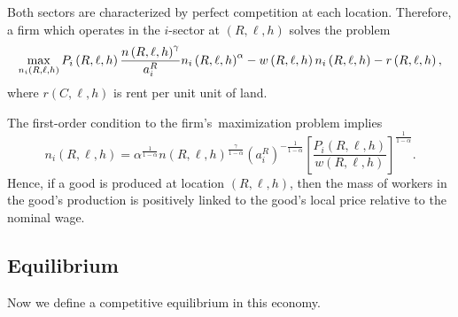\documentclass[12pt]{article}
\begin{document}
Both sectors are characterized by perfect competition
at each location. Therefore, a firm which operates in the $i$-sector at $%
\left( R,\ell ,h\right) $ solves the problem%
\begin{equation*}
\max_{n_{i}\left( R,\ell ,h\right) }P_{i}\left( R,\ell ,h\right) \frac{%
n \left( R,\ell ,h\right) ^{\gamma }}{a_{i}^{R}} n_{i}\left( R,\ell ,h\right) ^{\alpha } 
- w\left( R,\ell ,h\right)
n_{i}\left( R,\ell ,h\right) -r\left( R,\ell ,h\right) ,
\end{equation*}%
where $r\left( C,\ell ,h\right) $ is rent per unit unit of land.

The first-order condition to the firm's\ maximization problem implies%
\begin{equation}
n_{i}\left( R,\ell ,h\right) =\alpha ^{\frac{1}{1-\alpha }} n \left( R,\ell ,h\right)^{\frac{\gamma}{1-\alpha}} 
\left(a_{i}^{R}\right) ^{-\frac{1}{1-\alpha }}\left[ \frac{P_{i}\left( R,\ell
,h\right) }{w\left( R,\ell ,h\right) }\right] ^{\frac{1}{1-\alpha }}.
\end{equation}%
Hence, if a good is produced at location $\left( R,\ell ,h\right) $, then
the mass of workers in the good's production is positively linked to the
good's local price relative to the nominal wage.

\subsection{Equilibrium}

Now we define a competitive equilibrium in this economy.
\end{document}
